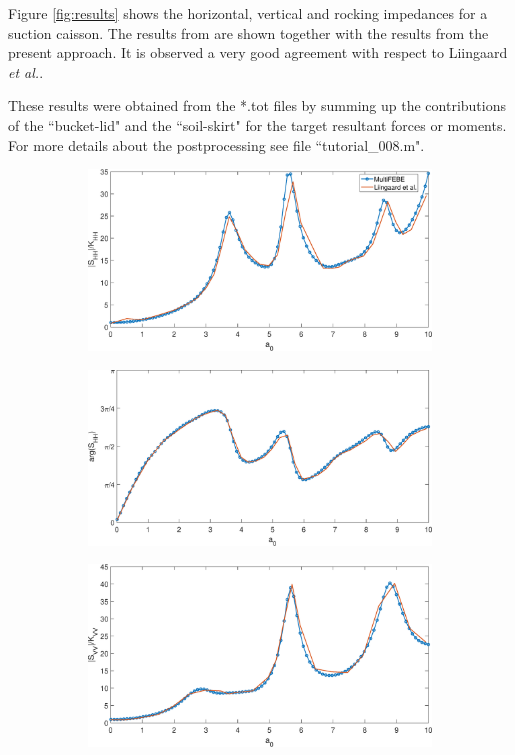 \documentclass[a4]{article}
\begin{document}
Figure \ref{fig:results} shows the horizontal, vertical and rocking impedances for a suction caisson. The results from \cite{liingaard} are shown together with the results from the present approach. It is observed a very good agreement with respect to Liingaard \textit{et al.}. 

These results were obtained from the *.tot files by summing up the contributions of the ``bucket-lid" and the ``soil-skirt" for the target resultant forces or moments. For more details about the postprocessing see file ``tutorial\_008.m".

\begin{figure}[tbh!]
	\centering
	\begin{subfigure}[b]{0.48\textwidth}
		\centering
		\includegraphics[width=\textwidth]{Shh.eps}
		\label{fig:Shh}
	\end{subfigure}
	\begin{subfigure}[b]{0.48\textwidth}
		\centering
		\includegraphics[width=\textwidth]{arg_Shh.eps}
		\label{fig:arg_Shh}
	\end{subfigure}
	\begin{subfigure}[b]{0.48\textwidth}
		\centering
		\includegraphics[width=\textwidth]{Svv.eps}

\end{subfigure}
\end{figure}
\end{document}
